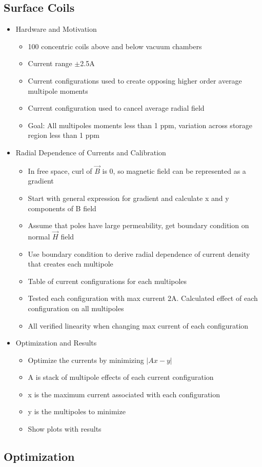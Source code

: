 \subsection{Surface Coils}
\begin{itemize}
  \item Hardware and Motivation
      \begin{itemize}
          \item 100 concentric coils above and below vacuum chambers
          \item Current range $\pm$2.5A 
          \item Current configurations used to create opposing higher order average multipole moments
          \item Current configuration used to cancel average radial field
          \item Goal: All multipoles moments less than 1 ppm, variation across storage region less than 1 ppm
      \end{itemize}
  \item Radial Dependence of Currents and Calibration
      \begin{itemize}
          \item In free space, curl of $\vec{B}$ is 0, so magnetic field can be represented as a gradient
          \item Start with general expression for gradient and calculate x and y components of B field
          \item Assume that poles have large permeability, get boundary condition on normal $\vec{H}$ field
          \item Use boundary condition to derive radial dependence of current density that creates each multipole
          \item Table of current configurations for each multipoles
          \item Tested each configuration with max current 2A. Calculated effect of each configuration on all multipoles
          \item All verified linearity when changing max current of each configuration
      \end{itemize}
  \item Optimization and Results
      \begin{itemize}
          \item Optimize the currents by minimizing $|Ax-y|$
          \item A is stack of multipole effects of each current configuration
          \item x is the maximum current associated with each configuration
          \item y is the multipoles to minimize
          \item Show plots with results
      \end{itemize}
\end{itemize}


\subsection{Optimization}


